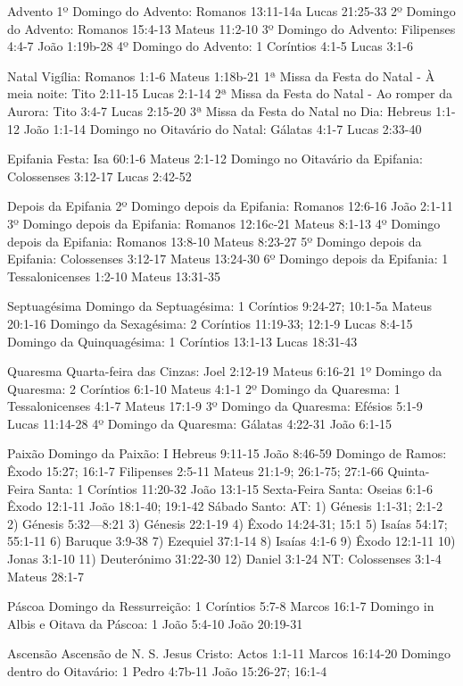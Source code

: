 Advento
1º Domingo do Advento:	Romanos 13:11-14a	Lucas 21:25-33
2º Domingo do Advento:	Romanos 15:4-13	Mateus 11:2-10
3º Domingo do Advento:	Filipenses 4:4-7	João 1:19b-28
4º Domingo do Advento:	1 Coríntios 4:1-5	Lucas 3:1-6

Natal
Vigília:	Romanos 1:1-6	Mateus 1:18b-21
1ª Missa da Festa do Natal - À meia noite:	Tito 2:11-15	Lucas 2:1-14
2ª Missa da Festa do Natal - Ao romper da Aurora:	Tito 3:4-7	Lucas 2:15-20
3ª Missa da Festa do Natal no Dia:	Hebreus 1:1-12	João 1:1-14
Domingo no Oitavário do Natal:	Gálatas 4:1-7	Lucas 2:33-40

Epifania
Festa: Isa 60:1-6	Mateus 2:1-12
Domingo no Oitavário da Epifania: Colossenses 3:12-17	Lucas 2:42-52

Depois da Epifania
2º Domingo depois da Epifania:	Romanos 12:6-16	João 2:1-11
3º Domingo depois da Epifania:	Romanos 12:16c-21	Mateus 8:1-13
4º Domingo depois da Epifania:	Romanos 13:8-10	Mateus 8:23-27
5º Domingo depois da Epifania:	Colossenses 3:12-17	Mateus 13:24-30
6º Domingo depois da Epifania:	1 Tessalonicenses 1:2-10	Mateus 13:31-35

Septuagésima
Domingo da Septuagésima: 1 Coríntios 9:24-27; 10:1-5a	Mateus 20:1-16
Domingo da Sexagésima:	2 Coríntios 11:19-33; 12:1-9	Lucas 8:4-15
Domingo da Quinquagésima:	1 Coríntios 13:1-13	Lucas 18:31-43

Quaresma
Quarta-feira das Cinzas:	Joel 2:12-19	Mateus 6:16-21
1º Domingo da Quaresma:	2 Coríntios 6:1-10	Mateus 4:1-1
2º Domingo da Quaresma:	1 Tessalonicenses 4:1-7	Mateus 17:1-9
3º Domingo da Quaresma:	Efésios 5:1-9	Lucas 11:14-28
4º Domingo da Quaresma:	Gálatas 4:22-31	João 6:1-15

Paixão
Domingo da Paixão: I	Hebreus 9:11-15	João 8:46-59
Domingo de Ramos:	Êxodo 15:27; 16:1-7 Filipenses 2:5-11	Mateus 21:1-9; 26:1-75; 27:1-66
Quinta-Feira Santa:	1 Coríntios 11:20-32	João 13:1-15
Sexta-Feira Santa:	Oseias 6:1-6 Êxodo 12:1-11	João 18:1-40; 19:1-42
Sábado Santo:
AT:
1) Génesis 1:1-31; 2:1-2
2) Génesis 5:32—8:21
3) Génesis 22:1-19
4) Êxodo 14:24-31; 15:1
5) Isaías 54:17; 55:1-11
6) Baruque 3:9-38
7) Ezequiel 37:1-14
8) Isaías 4:1-6
9) Êxodo 12:1-11
10) Jonas 3:1-10
11) Deuterónimo 31:22-30
12) Daniel 3:1-24
NT: Colossenses 3:1-4	Mateus 28:1-7

Páscoa
Domingo da Ressurreição:	1 Coríntios 5:7-8	Marcos 16:1-7
Domingo in Albis e Oitava da Páscoa:	1 João 5:4-10	João 20:19-31

Ascensão
Ascensão de N. S. Jesus Cristo:	Actos 1:1-11	Marcos 16:14-20
Domingo dentro do Oitavário:	1 Pedro 4:7b-11	João 15:26-27; 16:1-4

